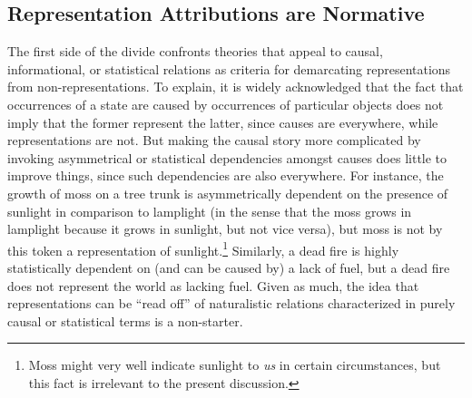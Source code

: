 \subsection{Representation Attributions are Normative}

The first side of the divide confronts theories that appeal to causal, informational, or statistical relations as criteria for demarcating representations from non-representations. To explain, it is widely acknowledged that the fact that occurrences of a state are caused by occurrences of particular objects does not imply that the former represent the latter, since causes are everywhere, while representations are not. But making the causal story more complicated by invoking asymmetrical \citep[][Ch. 4]{Fodor:1987} or statistical \citep{Eliasmith:2000} dependencies amongst causes does little to improve things, since such dependencies are also everywhere. For instance, the growth of moss on a tree trunk is asymmetrically dependent on the presence of sunlight in comparison to lamplight (in the sense that the moss grows in lamplight because it grows in sunlight, but not vice versa), but moss is not by this token a representation of sunlight.\footnote{Moss might very well indicate sunlight to \textit{us} in certain circumstances, but this fact is irrelevant to the present discussion.} Similarly, a dead fire is highly statistically dependent on (and can be caused by) a lack of fuel, but a dead fire does not represent the world as lacking fuel. Given as much, the idea that representations can be ``read off'' of naturalistic relations characterized in purely causal or statistical terms is a non-starter. 

